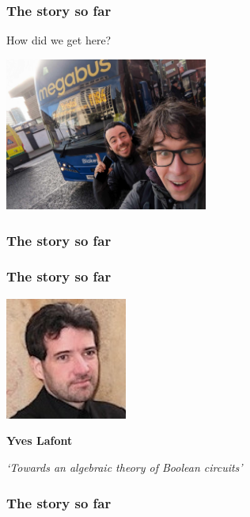 \begin{frame}
    \frametitle{The story so far}

    \centering
    \LARGE

    How did we get here?

    \includegraphics[width=0.5\textwidth]{imgs/megabus}

\end{frame}

\begin{frame}
    \frametitle{The story so far}

    \await
    \centering


\end{frame}

\begin{frame}
    \frametitle{The story so far}

    \centering
    \includegraphics[width=0.3\textwidth]{imgs/lafont}

    \LARGE
    \textbf{Yves Lafont}

    \normalsize
    \emph{`Towards an algebraic theory of Boolean circuits'}

\end{frame}

\begin{frame}
    \frametitle{The story so far}

    \centering


\end{frame}

